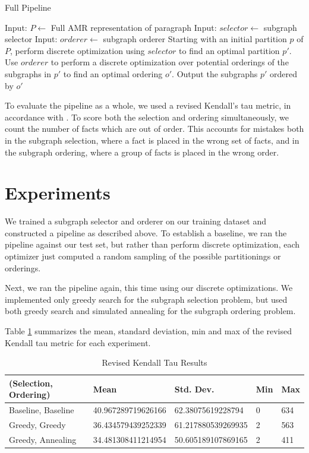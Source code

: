 \documentclass[12pt]{article}
\begin{document}
\begin{algorithm}
\caption{Full Pipeline}
\label{pipeline_procedure}
\begin{algorithmic}
\STATE Input: $P \gets$ Full AMR representation of paragraph
\STATE Input: $selector \gets$ subgraph selector
\STATE Input: $orderer \gets$ subgraph orderer
\STATE Starting with an initial partition $p$ of $P$, perform discrete
optimization using $selector$ to find an optimal partition $p'$.
\STATE Use $orderer$ to perform a discrete optimization over potential
orderings of the subgraphs in $p'$ to find an optimal ordering $o'$.
\STATE Output the subgraphs $p'$ ordered by $o'$
\end{algorithmic}
\end{algorithm}

To evaluate the pipeline as a whole, we used a revised Kendall's tau metric, in
accordance with \cite{lapata2006automatic}. To score both the selection and
ordering simultaneously, we count the number of facts which are out of order.
This accounts for mistakes both in the subgraph selection, where a fact is
placed in the wrong set of facts, and in the subgraph ordering, where a group
of facts is placed in the wrong order.

\section{Experiments}

We trained a subgraph selector and orderer on our training dataset and
constructed a pipeline as described above. To establish a baseline, we ran the
pipeline against our test set, but rather than perform discrete optimization,
each optimizer just computed a random sampling of the possible partitionings or
orderings.

Next, we ran the pipeline again, this time using our discrete optimizations.
We implemented only greedy search for the subgraph selection problem, but used
both greedy search and simulated annealing for the subgraph ordering problem.

Table \ref{tab:experiments} summarizes the mean, standard deviation, min and max of the
revised Kendall tau metric for each experiment.

\begin{table}[H]
\centering
\caption{Revised Kendall Tau Results}
\label{tab:experiments}
\begin{tabular}{@{}lllll@{}}
\toprule
\textbf{(Selection, Ordering)} & \textbf{Mean} & \textbf{Std. Dev.} & \textbf{Min} & \textbf{Max} \\ \midrule
Baseline, Baseline & 40.967289719626166 & 62.38075619228794 & 0 & 634 \\
Greedy, Greedy & 36.434579439252339 & 61.217880539269935 & 2 & 563 \\
Greedy, Annealing & 34.481308411214954 & 50.605189107869165 & 2 & 411 \\ \bottomrule
\end{tabular}
\end{table}
\end{document}
